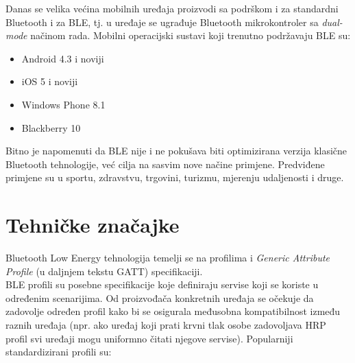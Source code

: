 Danas se velika većina mobilnih uređaja proizvodi sa podrškom i za standardni Bluetooth i za BLE, tj. u uređaje se ugrađuje Bluetooth mikrokontroler sa \textit{dual-mode} načinom rada. 
Mobilni operacijski sustavi koji trenutno podržavaju BLE su:

\begin{itemize}
    \item Android 4.3 i noviji
    \item iOS 5 i noviji
    \item Windows Phone 8.1
    \item Blackberry 10
\end{itemize}
Bitno je napomenuti da BLE nije i ne pokušava biti optimizirana verzija klasične Bluetooth tehnologije, već cilja na sasvim nove načine primjene. 
Predviđene primjene su u sportu, zdravstvu, trgovini, turizmu, mjerenju udaljenosti i druge.


\section{Tehničke značajke}

Bluetooth Low Energy tehnologija temelji se na profilima i \textit{Generic Attribute Profile} (u daljnjem tekstu GATT) specifikaciji. 
\\
BLE profili su posebne specifikacije koje definiraju servise koji se koriste u određenim scenarijima. 
Od proizvođača konkretnih uređaja se očekuje da zadovolje određen profil kako bi se osigurala međusobna kompatibilnost između raznih uređaja (npr. ako uređaj koji prati krvni tlak osobe zadovoljava HRP profil svi uređaji mogu uniformno čitati njegove servise). 
Popularniji standardizirani profili su:

